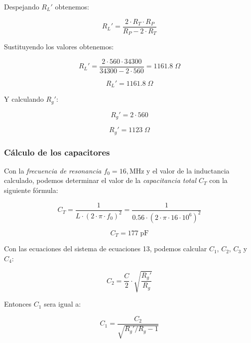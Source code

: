 Despejando $R_L'$ obtenemos:

\begin{equation}
    R_L' = \frac{2 \cdot R_T \cdot R_P}{R_P - 2 \cdot R_T} 
\end{equation}

Sustituyendo los valores obtenemos:

\begin{equation}
    R_L' = \frac{2 \cdot 560 \cdot 34300}{34300 - 2 \cdot 560} = 1161.8\; \Omega
\end{equation}

\begin{equation}
    \boxed{R_L' = 1161.8\; \Omega}
\end{equation}

Y calculando $R_g'$:

\begin{equation}
    R_g' = 2 \cdot 560
\end{equation}

\begin{equation}
    \boxed{R_g' = 1123\; \Omega}
\end{equation}

\subsubsection{Cálculo de los capacitores}

Con la \textit{frecuencia de resonancia $f_0 = 16 , \text{MHz}$} y el valor de la inductancia calculado, podemos determinar el valor de la \textit{capacitancia total $C_T$} con la siguiente fórmula:

\begin{equation}
    C_T = \frac{1}{L \cdot (2 \cdot \pi \cdot f_0)^2} = \frac{1}{0.56 \cdot (2 \cdot \pi \cdot 16 \cdot 10^6)^2} 
\end{equation}

\begin{equation}
    \boxed{C_T = 177\; \text{pF}}
\end{equation}

Con las ecuaciones del sistema de ecuaciones 13, podemos calcular $C_1$, $C_2$, $C_3$ y $C_4$:

\begin{equation}
    C_2 = \frac{C}{2} \cdot \sqrt{\frac{R_g'}{R_g}}
\end{equation}

Entonces $C_1$ sera igual a: 

\begin{equation}
    C_1 = \frac{C_2}{\sqrt{R_g' / R_g - 1}}
\end{equation}

